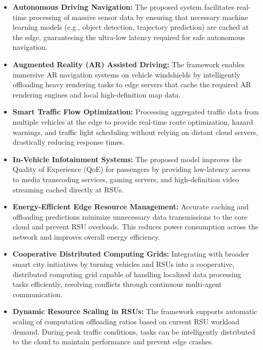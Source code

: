 \documentclass[12pt,a4paper]{report}
\begin{document}
\begin{itemize}

\item \textbf{Autonomous Driving Navigation:}  
The proposed system facilitates real-time processing of massive sensor data by ensuring that necessary machine learning models (e.g., object detection, trajectory prediction) are cached at the edge, guaranteeing the ultra-low latency required for safe autonomous navigation.

\item \textbf{Augmented Reality (AR) Assisted Driving:}  
The framework enables immersive AR navigation systems on vehicle windshields by intelligently offloading heavy rendering tasks to edge servers that cache the required AR rendering engines and local high-definition map data.

\item \textbf{Smart Traffic Flow Optimization:}  
Processing aggregated traffic data from multiple vehicles at the edge to provide real-time route optimization, hazard warnings, and traffic light scheduling without relying on distant cloud servers, drastically reducing response times.

\item \textbf{In-Vehicle Infotainment Systems:}  
The proposed model improves the Quality of Experience (QoE) for passengers by providing low-latency access to media transcoding services, gaming servers, and high-definition video streaming cached directly at RSUs.

\item \textbf{Energy-Efficient Edge Resource Management:}  
Accurate caching and offloading predictions minimize unnecessary data transmissions to the core cloud and prevent RSU overloads. This reduces power consumption across the network and improves overall energy efficiency.

\item \textbf{Cooperative Distributed Computing Grids:}  
Integrating with broader smart city initiatives by turning vehicles and RSUs into a cooperative, distributed computing grid capable of handling localized data processing tasks efficiently, resolving conflicts through continuous multi-agent communication.

\item \textbf{Dynamic Resource Scaling in RSUs:}  
The framework supports automatic scaling of computation offloading ratios based on current RSU workload demand. During peak traffic conditions, tasks can be intelligently distributed to the cloud to maintain performance and prevent edge crashes.


\end{itemize}
\end{document}

